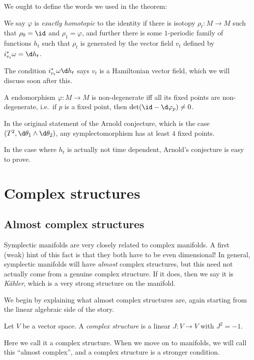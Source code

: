 \documentclass[a4paper]{article}
\begin{document}
We ought to define the words we used in the theorem:

\begin{defi}
  We say $\varphi$ is \emph{exactly homotopic} to the identity if there is isotopy $\rho_t: M \to M$ such that $\rho_0 = \id$ and $\rho_1 = \varphi$, and further there is some $1$-periodic family of functions $h_t$ such that $\rho_t$ is generated by the vector field $v_t$ defined by $i_{v_t}^* \omega = \d h_t$.
\end{defi}
The condition $i_{v_t}^* \omega \d h_t$ says $v_t$ is a Hamiltonian vector field, which we will discuss soon after this.

\begin{defi}
  A endomorphism $\varphi: M \to M$ is non-degenerate iff all its fixed points are non-degenerate, i.e.\ if $p$ is a fixed point, then $\det (\id - \d \varphi_p) \not= 0$.
\end{defi}
\begin{eg}
  In the original statement of the Arnold conjecture, which is the case $(T^2, \d \theta_1 \wedge \d \theta_2)$, any symplectomorphism has at least $4$ fixed points.
\end{eg}

In the case where $h_t$ is actually not time dependent, Arnold's conjecture is easy to prove.

\section{Complex structures}
\subsection{Almost complex structures}
Symplectic manifolds are very closely related to complex manifolds. A first (weak) hint of this fact is that they both have to be even dimensional! In general, symplectic manifolds will have \emph{almost} complex structures, but this need not actually come from a genuine complex structure. If it does, then we say it is \emph{K\"ahler}, which is a very strong structure on the manifold.

We begin by explaining what almost complex structures are, again starting from the linear algebraic side of the story.

\begin{defi}
  Let $V$ be a vector space. A \emph{complex structure} is a linear $J: V \to V$ with $J^2 = -1$.
\end{defi}
Here we call it a complex structure. When we move on to manifolds, we will call this ``almost complex'', and a complex structure is a stronger condition.
\end{document}
